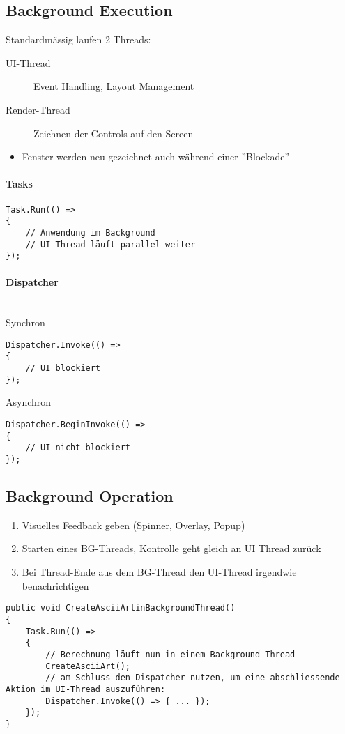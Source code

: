 \subsection{Background Execution}
Standardmässig laufen 2 Threads:
\begin{description}
    \item[UI-Thread] Event Handling, Layout Management
    \item[Render-Thread] Zeichnen der Controls auf den Screen
\end{description}
\begin{itemize}
    \item Fenster werden neu gezeichnet auch während einer ''Blockade''
\end{itemize}

\paragraph{Tasks}
\begin{lstlisting}
Task.Run(() =>
{
    // Anwendung im Background
    // UI-Thread läuft parallel weiter
});
\end{lstlisting}

\paragraph{Dispatcher}
\\
Synchron
\begin{lstlisting}
Dispatcher.Invoke(() =>
{
    // UI blockiert
});
\end{lstlisting}
Asynchron
\begin{lstlisting}
Dispatcher.BeginInvoke(() =>
{
    // UI nicht blockiert
});
\end{lstlisting}


\subsection{Background Operation}
\begin{enumerate}
    \item Visuelles Feedback geben (Spinner, Overlay, Popup)
    \item Starten eines BG-Threads, Kontrolle geht gleich an UI Thread zurück
    \item Bei Thread-Ende aus dem BG-Thread den UI-Thread irgendwie benachrichtigen
\end{enumerate}
\begin{lstlisting}
public void CreateAsciiArtinBackgroundThread()
{
    Task.Run(() =>
    {
        // Berechnung läuft nun in einem Background Thread
        CreateAsciiArt();
        // am Schluss den Dispatcher nutzen, um eine abschliessende Aktion im UI-Thread auszuführen: 
        Dispatcher.Invoke(() => { ... });
    });
}
\end{lstlisting}





